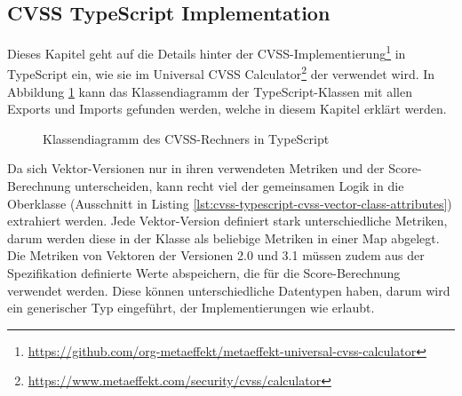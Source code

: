 \subsection{CVSS TypeScript Implementation} \label{subsec:projektbericht-loesungsweg-typescript-cvss-online-calculator}

Dieses Kapitel geht auf die Details hinter der CVSS-Implementierung\footnote{\url{https://github.com/org-metaeffekt/metaeffekt-universal-cvss-calculator}} in TypeScript ein, wie sie im Universal CVSS Calculator\footnote{\url{https://www.metaeffekt.com/security/cvss/calculator}} der {\metaeffekt} verwendet wird.
In Abbildung \ref{fig:cvss-ts-calculator-class-diagram} kann das Klassendiagramm der TypeScript-Klassen mit allen Exports und Imports gefunden werden, welche in diesem Kapitel erklärt werden.

\begin{figure}[htbp] %
    \centering
    \caption{Klassendiagramm des CVSS-Rechners in TypeScript}
    \label{fig:cvss-ts-calculator-class-diagram}
\end{figure}

Da sich Vektor-Versionen nur in ihren verwendeten Metriken und der Score-Berechnung unterscheiden, kann recht viel der gemeinsamen Logik in die Oberklasse  (Ausschnitt in Listing \ref{lst:cvss-typescript-cvss-vector-class-attributes}) extrahiert werden.
Jede Vektor-Version definiert stark unterschiedliche Metriken, darum werden diese in der Klasse als beliebige Metriken in einer Map abgelegt.
Die Metriken von Vektoren der Versionen 2.0 und 3.1 müssen zudem aus der Spezifikation definierte Werte abspeichern, die für die Score-Berechnung verwendet werden.
Diese können unterschiedliche Datentypen haben, darum wird ein generischer Typ  eingeführt, der Implementierungen wie  erlaubt.

